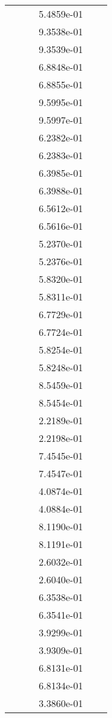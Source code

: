 \begin{xltabular}{\textwidth}{r|rS[table-format=1.3e+2]S[table-format=1.4e+2]S[table-format=1.4e+2]S[table-format=-1.5]}
&  &  & 5.4859e-01 & & \\
&  &  & 9.3538e-01 & & \\
&  &  & 9.3539e-01 & & \\
&  &  & 6.8848e-01 & & \\
&  &  & 6.8855e-01 & & \\
&  &  & 9.5995e-01 & & \\
&  &  & 9.5997e-01 & & \\
&  &  & 6.2382e-01 & & \\
&  &  & 6.2383e-01 & & \\
&  &  & 6.3985e-01 & & \\
&  &  & 6.3988e-01 & & \\
&  &  & 6.5612e-01 & & \\
&  &  & 6.5616e-01 & & \\
&  &  & 5.2370e-01 & & \\
&  &  & 5.2376e-01 & & \\
&  &  & 5.8320e-01 & & \\
&  &  & 5.8311e-01 & & \\
&  &  & 6.7729e-01 & & \\
&  &  & 6.7724e-01 & & \\
&  &  & 5.8254e-01 & & \\
&  &  & 5.8248e-01 & & \\
&  &  & 8.5459e-01 & & \\
&  &  & 8.5454e-01 & & \\
&  &  & 2.2189e-01 & & \\
&  &  & 2.2198e-01 & & \\
&  &  & 7.4545e-01 & & \\
&  &  & 7.4547e-01 & & \\
&  &  & 4.0874e-01 & & \\
&  &  & 4.0884e-01 & & \\
&  &  & 8.1190e-01 & & \\
&  &  & 8.1191e-01 & & \\
&  &  & 2.6032e-01 & & \\
&  &  & 2.6040e-01 & & \\
&  &  & 6.3538e-01 & & \\
&  &  & 6.3541e-01 & & \\
&  &  & 3.9299e-01 & & \\
&  &  & 3.9309e-01 & & \\
&  &  & 6.8131e-01 & & \\
&  &  & 6.8134e-01 & & \\
&  &  & 3.3860e-01 & & \\

\end{xltabular}
